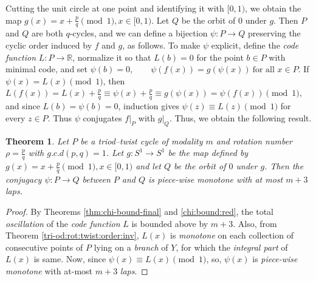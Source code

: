 \documentclass[12pt,reqno]{amsart}
\newtheorem{theorem}{Theorem}[section]
\theoremstyle{definition}
\theoremstyle{remark}
\theoremstyle{assumption}
\numberwithin{equation}{section}
\begin{document}
Cutting the unit circle at one point and identifying it with $[0,1)$,
we obtain the map $g(x)=x+\tfrac pq\pmod1,  x\in[0,1)$.  Let $Q$ be the orbit of $0$ under $g$. Then $P$ and $Q$ are both $q$-cycles, and we can define a bijection $\psi:P\to Q$ preserving the cyclic order induced by $f$ and $g$, as follows.  To make $\psi$ explicit, define the \emph{code function} $L:P\to\mathbb R$, normalize it so that $L(b)=0$ for the point $b\in P$ with minimal code,
and set $\psi(b)=0,\qquad \psi(f(x))=g(\psi(x))\ \text{for all }x\in P$. If $\psi(x)=L(x)\pmod1$, then
$L(f(x))=L(x)+\tfrac pq \equiv\psi(x)+\tfrac pq \equiv g(\psi(x)) =\psi(f(x))\pmod1$,
and since $L(b)=\psi(b)=0$, induction gives $\psi(z)\equiv L(z)\pmod1$ for every $z\in P$. Thus $\psi$ conjugates $f|_P$ with $g|_Q$. Thus, we obtain the following result. 

\begin{theorem}\label{thm:triod-twist-rotation}
	Let $P$ be a triod–twist cycle of modality $m$ and rotation number
	$\rho=\tfrac pq$ with $g.c.d (p,q)=1$. Let $g: S^1 \to S^1$ be the map defined by $g(x)=x+\tfrac pq\pmod1, x\in[0,1)$ and let $Q$ be the orbit of $0$ under $g$. Then the conjugacy $\psi:P\to Q$ between $P$ and $Q$ is piece-wise monotone with at most $m+3$ laps. 

\end{theorem}

\begin{proof}
	By Theorems \ref{thm:chi-bound-final} and \ref{chi:bound:red}, 
	the total \emph{oscillation} of the \emph{code function} $L$ is bounded above by $m+3$. Also, from Theorem \ref{tri-od:rot:twist:order:inv}, $L(x)$ is \emph{monotone} on each collection of consecutive points of $P$ lying on a \emph{branch} of $Y$, for which the \emph{integral part} of $L(x)$ is same.  Now, since $\psi(x)\equiv L(x)\pmod1$, so, $\psi(x)$ is \emph{piece-wise monotone} with at-most $m+3$ \emph{laps}. 

\end{proof}
\end{document}
